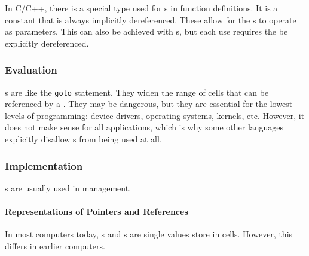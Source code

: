 In C/C++, there is a special  type used for s in function definitions.
It is a constant  that is always implicitly dereferenced.
These allow for the s to operate as  parameters.
This can also be achieved with s, but each use requires the  be explicitly dereferenced.

\subsubsection{Evaluation}\label{subsubsec:Pointer-Evaluation}
s are like the \texttt{goto} statement.
They widen the range of  cells that can be referenced by a .
They may be dangerous, but they are essential for the lowest levels of programming: device drivers, operating systems, kernels, etc.
However, it does not make sense for all applications, which is why some other languages explicitly disallow s from being used at all.

\subsubsection{Implementation}\label{subsubsec:Pointer-Implementation}
s are usually used in  management.

\paragraph{Representations of Pointers and References}\label{par:Pointer-Representations}
In most computers today, s and s are single values store in  cells.
However, this differs in earlier computers.

